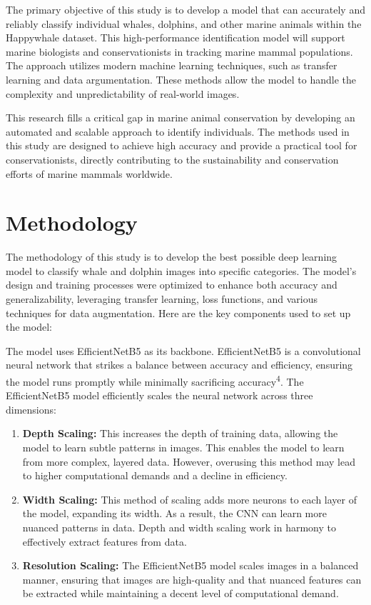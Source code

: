 \documentclass[twocolumn]{article}
\begin{document}
The primary objective of this study is to develop a model that can accurately and reliably classify individual whales, dolphins, and other marine animals within the Happywhale dataset. This high-performance identification model will support marine biologists and conservationists in tracking marine mammal populations. The approach utilizes modern machine learning techniques, such as transfer learning and data argumentation. These methods allow the model to handle the complexity and unpredictability of real-world images. 

This research fills a critical gap in marine animal conservation by developing an automated and scalable approach to identify individuals. The methods used in this study are designed to achieve high accuracy and provide a practical tool for conservationists, directly contributing to the sustainability and conservation efforts of marine mammals worldwide. 

\section{Methodology}
The methodology of this study is to develop the best possible deep learning model to classify whale and dolphin images into specific categories. The model’s design and training processes were optimized to enhance both accuracy and generalizability, leveraging transfer learning, loss functions, and various techniques for data augmentation. Here are the key components used to set up the model:

The model uses EfficientNetB5 as its backbone. EfficientNetB5 is a convolutional neural network that strikes a balance between accuracy and efficiency, ensuring the model runs promptly while minimally sacrificing accuracy\textsuperscript{4}. The EfficientNetB5 model efficiently scales the neural network across three dimensions: 

\begin{enumerate}
    \item \textbf{Depth Scaling:} This increases the depth of training data, allowing the model to learn subtle patterns in images. This enables the model to learn from more complex, layered data. However, overusing this method may lead to higher computational demands and a decline in efficiency.
    \item \textbf{Width Scaling:} This method of scaling adds more neurons to each layer of the model, expanding its width. As a result, the CNN can learn more nuanced patterns in data. Depth and width scaling work in harmony to effectively extract features from data.
    \item \textbf{Resolution Scaling:} The EfficientNetB5 model scales images in a balanced manner, ensuring that images are high-quality and that nuanced features can be extracted while maintaining a decent level of computational demand.
\end{enumerate}
\end{document}
